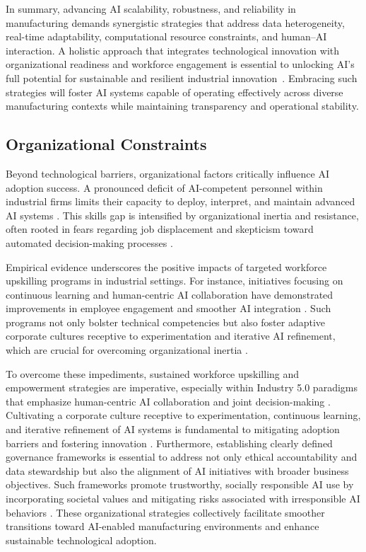 \documentclass[sigconf]{acmart}
\begin{document}
In summary, advancing AI scalability, robustness, and reliability in manufacturing demands synergistic strategies that address data heterogeneity, real-time adaptability, computational resource constraints, and human–AI interaction. A holistic approach that integrates technological innovation with organizational readiness and workforce engagement is essential to unlocking AI's full potential for sustainable and resilient industrial innovation~\cite{ref6,ref19}. Embracing such strategies will foster AI systems capable of operating effectively across diverse manufacturing contexts while maintaining transparency and operational stability.

\subsection{Organizational Constraints}

Beyond technological barriers, organizational factors critically influence AI adoption success. A pronounced deficit of AI-competent personnel within industrial firms limits their capacity to deploy, interpret, and maintain advanced AI systems \cite{ref7,ref26}. This skills gap is intensified by organizational inertia and resistance, often rooted in fears regarding job displacement and skepticism toward automated decision-making processes \cite{ref3,ref26}.

Empirical evidence underscores the positive impacts of targeted workforce upskilling programs in industrial settings. For instance, initiatives focusing on continuous learning and human-centric AI collaboration have demonstrated improvements in employee engagement and smoother AI integration \cite{ref3,ref38}. Such programs not only bolster technical competencies but also foster adaptive corporate cultures receptive to experimentation and iterative AI refinement, which are crucial for overcoming organizational inertia \cite{ref26,ref38}. 

To overcome these impediments, sustained workforce upskilling and empowerment strategies are imperative, especially within Industry 5.0 paradigms that emphasize human-centric AI collaboration and joint decision-making \cite{ref3}. Cultivating a corporate culture receptive to experimentation, continuous learning, and iterative refinement of AI systems is fundamental to mitigating adoption barriers and fostering innovation \cite{ref26,ref38}. Furthermore, establishing clearly defined governance frameworks is essential to address not only ethical accountability and data stewardship but also the alignment of AI initiatives with broader business objectives. Such frameworks promote trustworthy, socially responsible AI use by incorporating societal values and mitigating risks associated with irresponsible AI behaviors \cite{ref26}. These organizational strategies collectively facilitate smoother transitions toward AI-enabled manufacturing environments and enhance sustainable technological adoption.
\end{document}
